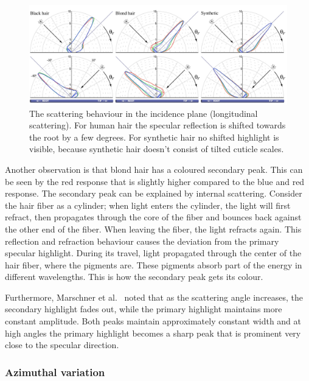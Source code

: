 \documentclass[11pt,a4paper]{report}
\begin{document}
\begin{figure}[h]
\begin{center}
\includegraphics[scale=0.35]{images/longitudinal_response.jpeg}
\caption{The scattering behaviour in the incidence plane (longitudinal scattering). For human hair the specular reflection is shifted towards the root by a few degrees. For synthetic hair no shifted highlight is visible, because synthetic hair doesn't consist of tilted cuticle scales.}
\label{fig_longitudinal_marschner}
\end{center}
\end{figure}

Another observation is that blond hair has a coloured secondary peak. This can be seen by the red response that is slightly higher compared to the blue and red response. The secondary peak can be explained by internal scattering. Consider the hair fiber as a cylinder; when light enters the cylinder, the light will first refract, then propagates through the core of the fiber and bounces back against the other end of the fiber. When leaving the fiber, the light refracts again. This reflection and refraction behaviour causes the deviation from the primary specular highlight. During its travel, light propagated through the center of the hair fiber, where the pigments are. These pigments absorb part of the energy in different wavelengths. This is how the secondary peak gets its colour.

Furthermore, Marschner et al.~\cite{marschner} noted that as the scattering angle increases, the secondary highlight fades out, while the primary highlight maintains more constant amplitude. Both peaks maintain approximately constant width and at high angles the primary highlight becomes a sharp peak that is prominent very close to the specular direction. 


\subsubsection{Azimuthal variation}
\end{document}
